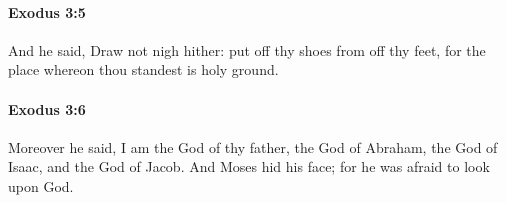 		\paragraph{Exodus 3:5} %
			\label{EXODUS-3-5}

			And he said, Draw not nigh hither: put off thy shoes from off thy feet, for the place whereon thou standest is holy ground.


		\paragraph{Exodus 3:6} %
			\label{EXODUS-3-6}

			Moreover he said, I am the God of thy father, the God of Abraham, the God of Isaac, and the God of Jacob. And Moses hid his face; for he was afraid to look upon God.


